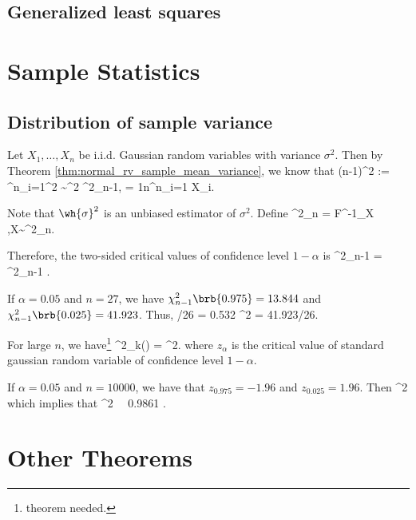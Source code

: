\subsection{Generalized least squares}



\section{Sample Statistics}

\subsection{Distribution of sample variance}

Let $X_1,\dots,X_n$ be i.i.d. Gaussian random variables with variance $\sigma^2$. Then by Theorem \ref{thm:normal_rv_sample_mean_variance}, we know that
\be
(n-1)\wh{\sigma}^2 := \sum^n_{i=1}^2 \sim \sigma^2 \chi^2_{n-1},\qquad {} = \frac 1n\sum^n_{i=1} X_i.
\ee

Note that $\wh{\sigma}^2$ is an unbiased estimator of $\sigma^2$. Define
\be
\chi^2_n\brb{\alpha} = F^{-1}_X ,\quad X\sim \chi^2_n.
\ee

Therefore, the two-sided critical values of confidence level $1-\alpha$ is
\be
\chi^2_{n-1} =  \leq \chi^2_{n-1}  .
\ee

If $\alpha = 0.05$ and $n= 27$, we have $\chi^2_{n-1}\brb{0.975} = 13.844$ and $\chi^2_{n-1}\brb{0.025} = 41.923$. Thus,
/26 = 0.532 \leq \brb{\frac{\wh{\sigma}}{\sigma}}^2  = 41.923/26.
\ee

For large $n$, we have\footnote{theorem needed.}
\be
\chi^2_{k}(\alpha) =  ^2.
\ee
where $z_{\alpha}$ is the critical value of standard gaussian random variable of confidence level $1-\alpha$.

If $\alpha = 0.05$ and $n = 10000$, we have that $z_{0.975} = -1.96$ and $z_{0.025} = 1.96$. Then
\be
{} \leq \brb{\frac{\wh{\sigma}}{\sigma}}^2 \leq {}
\ee
which implies that
 \leq \brb{\frac{\wh{\sigma}}{\sigma}}^2  \ \ra\ 0.9861 \leq \frac{\wh{\sigma}}{\sigma} .
\ee

\section{Other Theorems}

